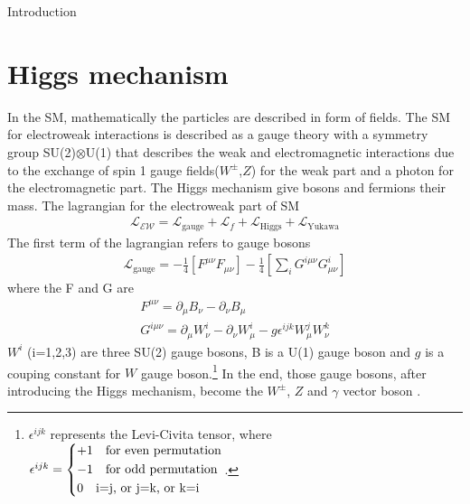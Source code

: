 \begin{chapter}{Introduction}
\section{Higgs mechanism}
In the SM, mathematically the particles are described in form of fields. The SM for electroweak interactions is described as a gauge theory with a symmetry group SU(2)$\otimes$U(1)
that describes the weak and electromagnetic interactions
due to the exchange of spin 1 gauge fields($W^{\pm}$,$Z$) for the weak part and a photon for the electromagnetic part. The Higgs mechanism give bosons and fermions their mass. The lagrangian for the electroweak part of SM
\begin{align}\label{sml}
\mathcal{L_{\text{EW}}}=\mathcal{L}_\text{gauge}+\mathcal{L}_f +\mathcal{L}_\text{Higgs} + \mathcal{L}_\text{Yukawa}
\end{align}
The first term of the lagrangian refers to gauge bosons 
 \begin{align}\label{smg}
 \mathcal{L}_\text{gauge}=-\frac{1}{4}\left[F^{\mu\nu}F_{\mu\nu}\right]-\frac{1}{4}\left[\sum_{i}G^{i\mu\nu}G^i_{\mu\nu}\right]
 \end{align}
where the F and G are 
\begin{align}
F^{\mu \nu}=\partial_\mu B_\nu -\partial_\nu B_\mu \\
G^{i\mu\nu}=\partial_\mu W^i_\nu -\partial_\nu W^i_\mu -g\epsilon^{ijk}W^j_\mu W^k_\nu 
\end{align}
$W^i$ (i=1,2,3) are three SU(2) gauge bosons, B is a U(1) gauge boson and $g$  is a couping constant for $W$ gauge boson.\footnote{$\epsilon^{ijk}$ represents the Levi-Civita tensor, where $\epsilon^{ijk}= \begin{dcases}
	+1 \quad \text{for even permutation} \\
	-1 \quad \text{for odd permutation}\\
	0 \quad \text{i=j, or j=k, or k=i } 
	\end{dcases}$.} In the end, those gauge bosons, after introducing the Higgs mechanism, become the $W^\pm$, $Z$ and $\gamma$ vector boson
\cite{ew1,ew2}. %


\end{chapter}
